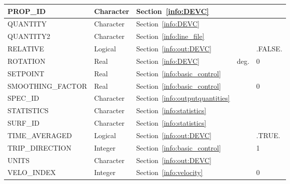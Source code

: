 \documentclass[11pt]{book}
\begin{document}
\begin{longtable}{@{\extracolsep{\fill}}|l|l|l|l|l|}
{\ct PROP\_ID}              & Character       & Section~\ref{info:DEVC}                                         &       &               \\ \hline
{\ct QUANTITY}              & Character       & Section~\ref{info:DEVC}                                         &       &               \\ \hline
{\ct QUANTITY2}             & Character       & Section~\ref{info:line_file}                                    &       &               \\ \hline
{\ct RELATIVE}              & Logical         & Section~\ref{info:out:DEVC}                                     &       & {\ct .FALSE.} \\ \hline
{\ct ROTATION}              & Real            & Section~\ref{info:DEVC}                                         & deg.  & 0             \\ \hline
{\ct SETPOINT}              & Real            & Section~\ref{info:basic_control}                                &       &               \\ \hline
{\ct SMOOTHING\_FACTOR}     & Real            & Section~\ref{info:basic_control}                                &       & 0             \\ \hline
{\ct SPEC\_ID}              & Character       & Section~\ref{info:outputquantities}                             &       &               \\ \hline
{\ct STATISTICS}            & Character       & Section~\ref{info:statistics}                                   &       &               \\ \hline
{\ct SURF\_ID}              & Character       & Section~\ref{info:statistics}                                   &       &               \\ \hline
{\ct TIME\_AVERAGED}        & Logical         & Section~\ref{info:out:DEVC}                                     &       &  {\ct .TRUE.} \\ \hline
{\ct TRIP\_DIRECTION}       & Integer         & Section~\ref{info:basic_control}                                &       &  1            \\ \hline
{\ct UNITS}                 & Character       & Section~\ref{info:out:DEVC}                                     &       &               \\ \hline
{\ct VELO\_INDEX}           & Integer         & Section~\ref{info:velocity}                                     &       &  0            \\ \hline

\end{longtable}
\end{document}
